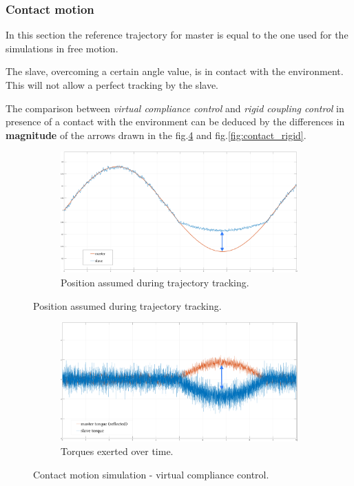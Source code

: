 \subsubsection{Contact motion}

In this section the reference trajectory for master is equal to the one used for the simulations in free motion.

The slave, overcoming a certain angle value, is in contact with the environment. This will not allow a perfect tracking by the slave.

The comparison between \textsl{virtual compliance control} and \textsl{rigid coupling control} in presence of a contact with the environment can be deduced by the
differences in \textbf{magnitude} of the arrows drawn in the fig.\ref{fig:contact_virtual} and fig.\ref{fig:contact_rigid}.

\begin{figure}[h]
	\begin{subfigure}{1\linewidth}
		\centering
		\includegraphics[width=\textwidth, height=0.41\textwidth]{Images/setPointContactReacPosArrow}
		\caption{Position assumed during trajectory tracking.}
		\label{fig:ContactSetPos}
	\end{subfigure}	
\end{figure}
\begin{figure}[h]\ContinuedFloat
	\begin{subfigure}{1\linewidth}
		\centering
		\includegraphics[width=\textwidth, height=0.41\textwidth]{Images/setPointContactReacTorArrow}
		\caption{Torques exerted over time.}
		\label{fig:ContactSetTor}
	\end{subfigure}	
 \caption{Contact motion simulation - virtual compliance control.}
 \label{fig:contact_virtual}
\end{figure}

